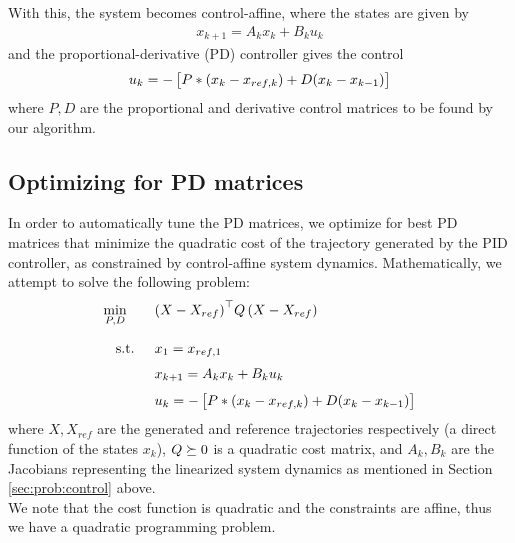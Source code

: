 \documentclass[11pt]{article}
\begin{document}
    With this, the system becomes control-affine, where the states are given by
    \begin{align*}
        x_{k+1} = A_k x_k + B_k u_k
    \end{align*}
    and the proportional-derivative (PD) controller gives the control
    \begin{align*}
        u_k = - \left[\strut P * \left(x_{k} - x_{ref,k}\right) + D (x_k - x_{k-1}) \strut \right]
    \end{align*}
    where $P,D$ are the proportional and derivative control matrices to be found by our algorithm.
    
    \pagebreak
    
    \subsection{Optimizing for PD matrices} \label{sec:prob:pdoptim}
    In order to automatically tune the PD matrices, we optimize for best PD matrices that minimize the quadratic cost of the trajectory generated by the PID controller, as constrained by control-affine system dynamics. Mathematically, we attempt to solve the following problem:
    \begin{align*}
        \min_{P,D}\qquad & \transp{X - X_{ref}} Q \left(X - X_{ref}\right) \fracln
        \st \quad & x_1 = x_{ref, 1} \vecln
        &         x_{k+1} = A_k x_k + B_k u_k \vecln
        &         u_k = - \left[\strut P * \left(x_{k} - x_{ref,k}\right) + D (x_k - x_{k-1}) \strut \right]
    \end{align*}
    where $X, X_{ref}$ are the generated and reference trajectories respectively (a direct function of the states $x_k$), $Q \succeq 0 $ is a quadratic cost matrix, and $A_k, B_k$ are the Jacobians representing the linearized system dynamics as mentioned in Section \ref{sec:prob:control} above. \\
    
    We note that the cost function is quadratic and the constraints are affine, thus we have a quadratic programming problem.
    
\end{document}
